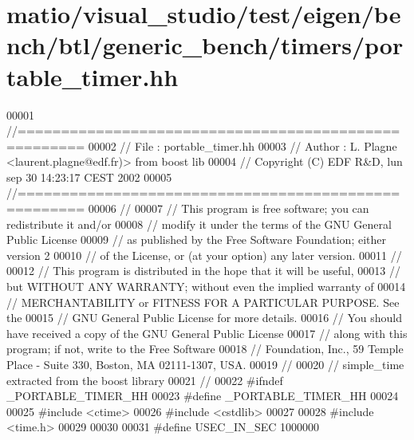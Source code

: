 \hypertarget{matio_2visual__studio_2test_2eigen_2bench_2btl_2generic__bench_2timers_2portable__timer_8hh_source}{}\section{matio/visual\+\_\+studio/test/eigen/bench/btl/generic\+\_\+bench/timers/portable\+\_\+timer.hh}
\label{matio_2visual__studio_2test_2eigen_2bench_2btl_2generic__bench_2timers_2portable__timer_8hh_source}

\begin{DoxyCode}
00001 \textcolor{comment}{//=====================================================}
00002 \textcolor{comment}{// File   :  portable\_timer.hh}
00003 \textcolor{comment}{// Author :  L. Plagne <laurent.plagne@edf.fr)> from boost lib}
00004 \textcolor{comment}{// Copyright (C) EDF R&D,  lun sep 30 14:23:17 CEST 2002}
00005 \textcolor{comment}{//=====================================================}
00006 \textcolor{comment}{//}
00007 \textcolor{comment}{// This program is free software; you can redistribute it and/or}
00008 \textcolor{comment}{// modify it under the terms of the GNU General Public License}
00009 \textcolor{comment}{// as published by the Free Software Foundation; either version 2}
00010 \textcolor{comment}{// of the License, or (at your option) any later version.}
00011 \textcolor{comment}{//}
00012 \textcolor{comment}{// This program is distributed in the hope that it will be useful,}
00013 \textcolor{comment}{// but WITHOUT ANY WARRANTY; without even the implied warranty of}
00014 \textcolor{comment}{// MERCHANTABILITY or FITNESS FOR A PARTICULAR PURPOSE.  See the}
00015 \textcolor{comment}{// GNU General Public License for more details.}
00016 \textcolor{comment}{// You should have received a copy of the GNU General Public License}
00017 \textcolor{comment}{// along with this program; if not, write to the Free Software}
00018 \textcolor{comment}{// Foundation, Inc., 59 Temple Place - Suite 330, Boston, MA  02111-1307, USA.}
00019 \textcolor{comment}{//}
00020 \textcolor{comment}{//  simple\_time extracted from the boost library}
00021 \textcolor{comment}{//}
00022 \textcolor{preprocessor}{#ifndef \_PORTABLE\_TIMER\_HH}
00023 \textcolor{preprocessor}{#define \_PORTABLE\_TIMER\_HH}
00024 
00025 \textcolor{preprocessor}{#include <ctime>}
00026 \textcolor{preprocessor}{#include <cstdlib>}
00027 
00028 \textcolor{preprocessor}{#include <time.h>}
00029 
00030 
00031 \textcolor{preprocessor}{#define USEC\_IN\_SEC 1000000}

\end{DoxyCode}
